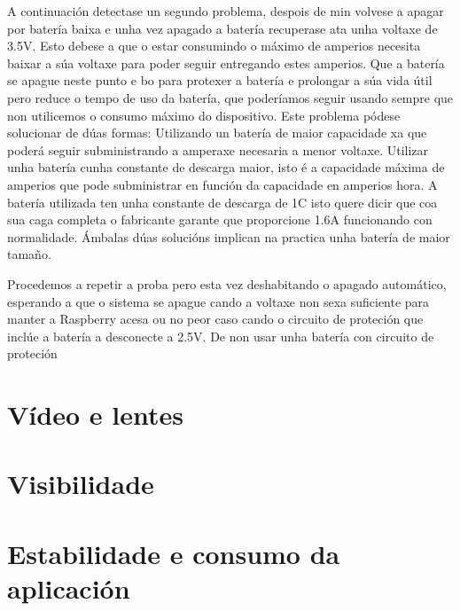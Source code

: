A continuación detectase un segundo problema, despois de  min volvese a apagar por batería baixa e unha vez apagado a batería recuperase ata unha voltaxe de 3.5V. Esto debese a que o estar consumindo o máximo de amperios necesita baixar a súa voltaxe para poder seguir entregando estes amperios. Que a batería se apague neste punto e bo para protexer a batería e prolongar a súa vida útil pero reduce o tempo de uso da batería, que poderíamos seguir usando sempre que non utilicemos o consumo máximo do dispositivo. Este problema pódese solucionar de dúas formas:
Utilizando un batería de maior capacidade xa que poderá seguir subministrando a amperaxe necesaria a menor voltaxe.
Utilizar unha batería cunha constante de descarga maior, isto é a capacidade máxima de amperios que pode subministrar en función da capacidade en amperios hora. A batería utilizada ten unha constante de descarga de 1C isto quere dicir que coa sua caga completa o fabricante garante que proporcione 1.6A funcionando con normalidade.
Ámbalas dúas solucións implican na practica unha batería de maior tamaño.

Procedemos a repetir a proba pero esta vez deshabitando o apagado automático, esperando a que o sistema se apague cando a voltaxe non sexa suficiente para manter a Raspberry acesa ou no peor caso cando o circuito de proteción que inclúe a batería a desconecte a 2.5V. De non usar unha batería con circuito de proteción

\section{Vídeo e lentes}

\section{Visibilidade}

\section{Estabilidade e consumo da aplicación}
